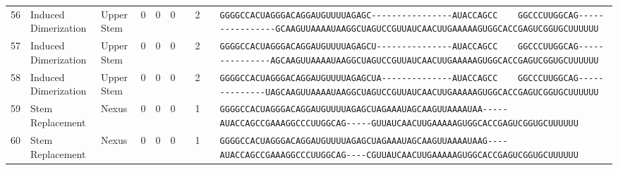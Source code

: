 \begin{tabular}{rllrrrrrcl}
 56 & Induced Dimerization & Upper Stem & 0 & 0 & 0 &  & 2 &  &
 \color{ucsfdarkgrey}\verb|GGGGCCACUAGGGACAGGAU|\color{ucsforange}\verb|GUUUUA|\color{ucsfblue}\verb|GAGC----------------|\color{ucsfpurple}\verb|AUACCAGCC    GGCCCUUGGCAG|\color{ucsfblue}\verb|----------------GCAAGU|\color{ucsforange}\verb|UAAAAUAA|\color{ucsfnavy}\verb|GGCUAGUCC|\color{ucsforange}\verb|GUUAUCA|\color{ucsfteal}\verb|ACUUGAAAAAGU|\color{ucsforange}\verb|GGCACCGAGUCGGUGCUUUUUU| \\

 57 & Induced Dimerization & Upper Stem & 0 & 0 & 0 &  & 2 &  &
 \color{ucsfdarkgrey}\verb|GGGGCCACUAGGGACAGGAU|\color{ucsforange}\verb|GUUUUA|\color{ucsfblue}\verb|GAGCU---------------|\color{ucsfpurple}\verb|AUACCAGCC    GGCCCUUGGCAG|\color{ucsfblue}\verb|---------------AGCAAGU|\color{ucsforange}\verb|UAAAAUAA|\color{ucsfnavy}\verb|GGCUAGUCC|\color{ucsforange}\verb|GUUAUCA|\color{ucsfteal}\verb|ACUUGAAAAAGU|\color{ucsforange}\verb|GGCACCGAGUCGGUGCUUUUUU| \\

 58 & Induced Dimerization & Upper Stem & 0 & 0 & 0 &  & 2 &  &
 \color{ucsfdarkgrey}\verb|GGGGCCACUAGGGACAGGAU|\color{ucsforange}\verb|GUUUUA|\color{ucsfblue}\verb|GAGCUA--------------|\color{ucsfpurple}\verb|AUACCAGCC    GGCCCUUGGCAG|\color{ucsfblue}\verb|--------------UAGCAAGU|\color{ucsforange}\verb|UAAAAUAA|\color{ucsfnavy}\verb|GGCUAGUCC|\color{ucsforange}\verb|GUUAUCA|\color{ucsfteal}\verb|ACUUGAAAAAGU|\color{ucsforange}\verb|GGCACCGAGUCGGUGCUUUUUU| \\

\midrule

 59 & Stem Replacement & Nexus & 0 & 0 & 0 &  & 1 &  &
 \color{ucsfdarkgrey}\verb|GGGGCCACUAGGGACAGGAU|\color{ucsforange}\verb|GUUUUA|\color{ucsfblue}\verb|GAGCUAGAAAUAGCAAGU|\color{ucsforange}\verb|UAAAAUAA|\color{ucsfnavy}\verb|-----|\color{ucsfpurple}\verb|AUACCAGCCGAAAGGCCCUUGGCAG|\color{ucsfnavy}\verb|-----GU|\color{ucsforange}\verb|UAUCA|\color{ucsfteal}\verb|ACUUGAAAAAGU|\color{ucsforange}\verb|GGCACCGAGUCGGUGCUUUUUU| \\

 60 & Stem Replacement & Nexus & 0 & 0 & 0 &  & 1 &  &
 \color{ucsfdarkgrey}\verb|GGGGCCACUAGGGACAGGAU|\color{ucsforange}\verb|GUUUUA|\color{ucsfblue}\verb|GAGCUAGAAAUAGCAAGU|\color{ucsforange}\verb|UAAAAUAA|\color{ucsfnavy}\verb|G----|\color{ucsfpurple}\verb|AUACCAGCCGAAAGGCCCUUGGCAG|\color{ucsfnavy}\verb|----CGU|\color{ucsforange}\verb|UAUCA|\color{ucsfteal}\verb|ACUUGAAAAAGU|\color{ucsforange}\verb|GGCACCGAGUCGGUGCUUUUUU| \\


\end{tabular}
